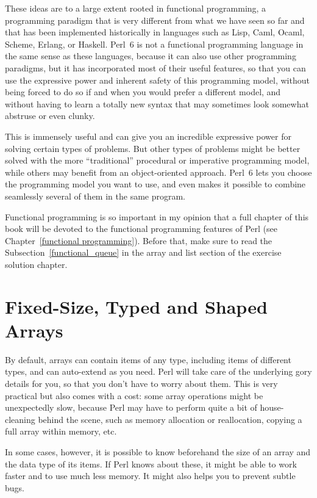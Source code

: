 These ideas are to a large extent rooted in functional 
programming, a programming paradigm that is very different 
from what we have seen so far and that has been implemented 
historically in languages such as Lisp, Caml, Ocaml, Scheme, 
Erlang, or Haskell. Perl~6 is not a functional 
programming language in the same sense as these languages, 
because it can also use other programming paradigms, 
but it has incorporated most of their useful features, so 
that you can use the expressive power and inherent safety 
of this programming model, without being forced to do so 
if and when you would prefer a different model, and
without having to learn a totally new syntax that may 
sometimes look somewhat abstruse or even clunky.

This is immensely useful and can give you an incredible 
expressive power for solving certain types of problems. But 
other types of problems might be better solved with the more 
``traditional'' procedural or imperative programming model, 
while others may benefit from an object-oriented approach. Perl~6 
lets you choose the programming model you want to use, and even 
makes it possible to combine seamlessly several of them in the 
same program.

Functional programming is so important in my opinion that a full chapter 
of this book will be devoted to the functional programming 
features of Perl (see Chapter~\ref{functional programming}). 
Before that, make sure to read the Subsection~\ref{functional_queue} 
in the array and list section of the exercise solution chapter.

\section{Fixed-Size, Typed and Shaped Arrays}

By default, arrays can contain items of any type, including 
items of different types, and can auto-extend as you need. 
Perl will take care of the underlying gory details for you, 
so that you don't have to worry about them. This is very 
practical but also comes with a cost: some array 
operations might be unexpectedly slow, because Perl may 
have to perform quite a bit of house-cleaning behind the 
scene, such as memory allocation or reallocation, copying 
a full array within memory, etc.

In some cases, however, it is possible to know beforehand 
the size of an array and the data type of its items. If 
Perl knows about these, it might be able to work faster and 
to use much less memory. It might also helps you 
to prevent subtle bugs.

